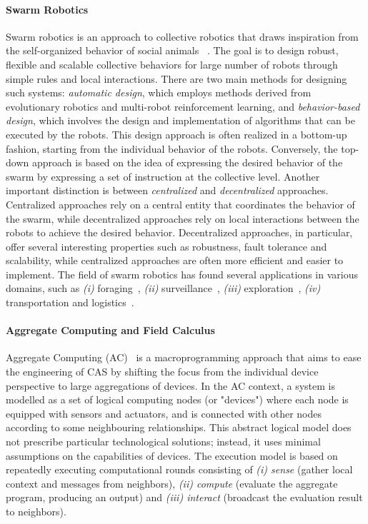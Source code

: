 \documentclass[12pt]{article}
\begin{document}
\paragraph{\textbf{Swarm Robotics}} Swarm robotics is an approach to collective robotics that draws inspiration from the self-organized behavior of social animals ~\cite{brambilla2013swarm}. The goal is to design robust, flexible and scalable 
collective behaviors for large number of robots through simple rules and local interactions. There are two main methods for designing such systems: \textit{automatic design}, which employs methods derived from
evolutionary robotics and multi-robot reinforcement learning, and \textit{behavior-based design}, which involves the design and implementation of algorithms that can be executed by the robots. This design approach is often realized
in a bottom-up fashion, starting from the individual behavior of the robots. Conversely, the top-down approach is based on the idea of expressing the desired behavior of the swarm by expressing a set of instruction at the collective level.
Another important distinction is between \textit{centralized} and \textit{decentralized} approaches. Centralized approaches rely on a central entity that coordinates the behavior of the swarm, while decentralized approaches rely on local interactions between the robots to achieve the desired behavior.
Decentralized approaches, in particular, offer several interesting properties such as robustness, fault tolerance and scalability, while centralized approaches are often more efficient and easier to implement.
The field of swarm robotics has found several applications in various domains, such as \textit{(i)} foraging~\cite{talamali2020sophisticated}, \textit{(ii)} surveillance~\cite{saska2016swarm}, \textit{(iii)} exploration~\cite{huang2019exploration}, \textit{(iv)} transportation and logistics~\cite{zhang2015swarm}.

\paragraph{\textbf{Aggregate Computing and Field Calculus}} Aggregate Computing (AC)~\cite{beal2016aggregate} is a macroprogramming approach that aims to ease the engineering of CAS by shifting the
focus from the individual device perspective to large aggregations of devices.
In the AC context, a system  is modelled as a set of logical computing nodes (or "devices")
where each node is equipped with sensors and actuators, and is connected with other nodes
according to some neighbouring relationships. This abstract logical model does not prescribe
particular technological solutions; instead, it uses minimal assumptions on the capabilities
of devices. The execution model is based on repeatedly executing computational rounds consisting of
\textit{(i) sense} (gather local context and messages from neighbors), \textit{(ii) compute} (evaluate the aggregate program, producing an output) and 
\textit{(iii) interact} (broadcast the evaluation result to neighbors).
\end{document}
